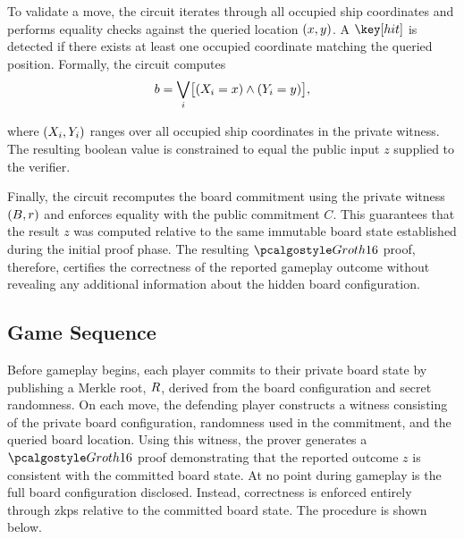 To validate a move, the circuit iterates through all occupied ship coordinates and performs equality checks against the queried location $\left(x, y\right)$. A $\hit$ is detected if there exists at least one occupied coordinate matching the queried position. Formally, the circuit computes
\begin{equation*}
    b = \bigvee_i \sbr{\del{X_i = x} \land \del{Y_i = y}},
\end{equation*}

\noindent where $\left(X_i, Y_i\right)$ ranges over all occupied ship coordinates in the private witness. The resulting boolean value is constrained to equal the public input $z$ supplied to the verifier.

Finally, the circuit recomputes the board commitment using the private witness $\left(B, r\right)$ and enforces equality with the public commitment $C$. This guarantees that the result $z$ was computed relative to the same immutable board state established during the initial proof phase. The resulting $\groth$ proof, therefore, certifies the correctness of the reported gameplay outcome without revealing any additional information about the hidden board configuration.

\subsection{Game Sequence}
\label{subsec:gameSequence}

Before gameplay begins, each player commits to their private board state by publishing a Merkle root, $R$, derived from the board configuration and secret randomness. On each move, the defending player constructs a witness consisting of the private board configuration, randomness used in the commitment, and the queried board location. Using this witness, the prover generates a $\groth$ proof demonstrating that the reported outcome $z$ is consistent with the committed board state. At no point during gameplay is the full board configuration disclosed. Instead, correctness is enforced entirely through \glspl{zkp} relative to the committed board state. The procedure is shown below.

